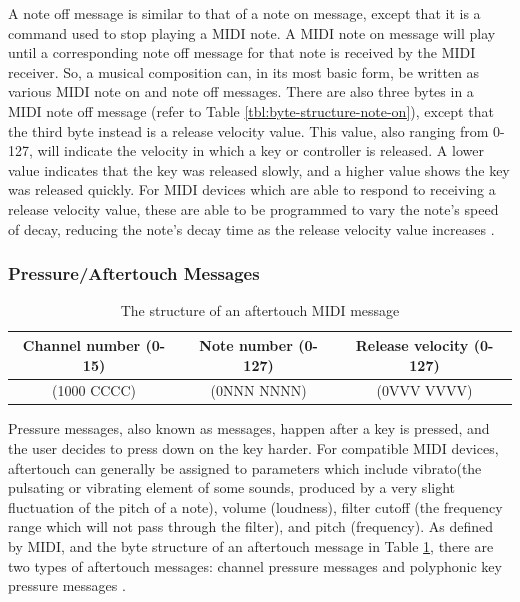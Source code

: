 A note off message is similar to that of a note on message, except that it is a command used to stop playing a MIDI note. A MIDI note on message will play until a corresponding note off message for that note is received by the MIDI receiver. So, a musical composition can, in its most basic form, be written as various MIDI note on and note off messages. There are also three bytes in a MIDI note off message (refer to Table \ref{tbl:byte-structure-note-on}), except that the third byte instead is a release velocity value. This value, also ranging from 0-127, will indicate the velocity in which a key or controller is released. A lower value indicates that the key was released slowly, and a higher value shows the key was released quickly. For MIDI devices which are able to respond to receiving a release velocity value, these are able to be programmed to vary the note's speed of decay, reducing the note's decay time as the release velocity value increases \cite{Kirk_Hunt_2013}. %

\subsubsection{Pressure/Aftertouch Messages}

\begin{table}
	\centering
	\begin{tabular}{|c|c|c|}
	\hline
		Channel number (0-15) & Note number (0-127) & Release velocity (0-127) \\
		\hline
		(1000 CCCC) & (0NNN NNNN) & (0VVV VVVV) \\
	\hline
	\end{tabular}
	\caption{The structure of an aftertouch MIDI message}
	\label{tbl:byte-structure-aftertouch}
\end{table}

Pressure messages, also known as  messages, happen after a key is pressed, and the user decides to press down on the key harder. For compatible MIDI devices, aftertouch can generally be assigned to parameters which include vibrato(the pulsating or vibrating element of some sounds, produced by a very slight fluctuation of the pitch of a note), volume (loudness), filter cutoff (the frequency range which will not pass through the filter), and pitch (frequency). As defined by MIDI, and the byte structure of an aftertouch message in Table \ref{tbl:byte-structure-aftertouch}, there are two types of aftertouch messages: channel pressure messages and polyphonic key pressure messages \cite{Huber_2012}. 

